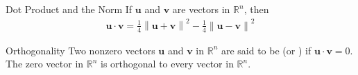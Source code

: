 \documentclass[\main/notes.tex]{subfiles}
\begin{document}
			\begin{theorem}{Dot Product and the Norm}
				If $\mathbf{u}$ and $\mathbf{v}$ are vectors in $\mathbb{R}^{n}$, then
				\begin{align*}
					\mathbf{u} \cdot \mathbf{v} = \frac{1}{4}\left\lVert \mathbf{u} + \mathbf{v}\right\rVert^{2} - \frac{1}{4}\left\lVert \mathbf{u} - \mathbf{v}\right\rVert^{2}
				\end{align*}
			\end{theorem}
			\begin{definition}{Orthogonality}
				Two nonzero vectors $\mathbf{u}$ and $\mathbf{v}$ in $\mathbb{R}^{n}$ are said to be  (or ) if $\mathbf{u} \cdot \mathbf{v} = 0$. The zero vector in $\mathbb{R}^{n}$ is orthogonal to every vector in $\mathbb{R}^{n}$.
			\end{definition}
\end{document}
